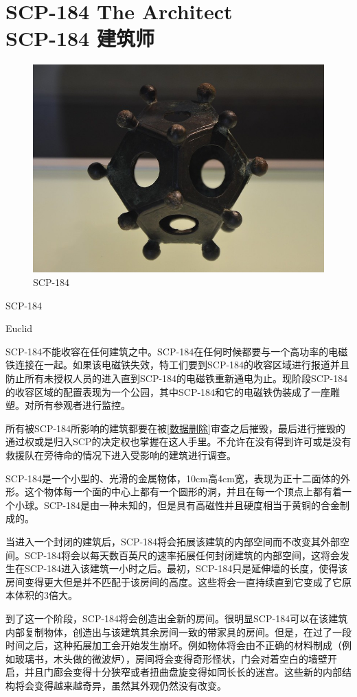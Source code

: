 \chapter[SCP-184 建筑师]{
    SCP-184 The Architect\\
    SCP-184 建筑师
}

\label{chap:SCP-184}

\begin{figure}[H]
    \centering
    \includegraphics[width=0.5\linewidth]{images/SCP-184.jpg}
    \caption*{SCP-184}
\end{figure}

SCP-184

Euclid

SCP-184不能收容在任何建筑之中。SCP-184在任何时候都要与一个高功率的电磁铁连接在一起。如果该电磁铁失效，特工们要到SCP-184的收容区域进行报道并且防止所有未授权人员的进入直到SCP-184的电磁铁重新通电为止。现阶段SCP-184的收容区域的配置表现为一个公园，其中SCP-184和它的电磁铁伪装成了一座雕塑。对所有参观者进行监控。

所有被SCP-184所影响的建筑都要在被{[}\hyperref[chap:TAIL-code-name-the-truth]{数据删除}]审查之后摧毁，最后进行摧毁的通过权或是归入SCP的决定权也掌握在这人手里。不允许在没有得到许可或是没有救援队在旁待命的情况下进入受影响的建筑进行调查。

SCP-184是一个小型的、光滑的金属物体，10cm高4cm宽，表现为正十二面体的外形。这个物体每一个面的中心上都有一个圆形的洞，并且在每一个顶点上都有着一个小球。SCP-184是由一种未知的，但是具有高磁性并且硬度相当于黄铜的合金制成的。

当进入一个封闭的建筑后，SCP-184将会拓展该建筑的内部空间而不改变其外部空间。SCP-184将会以每天数百英尺的速率拓展任何封闭建筑的内部空间，这将会发生在SCP-184进入该建筑一小时之后。最初，SCP-184只是延伸墙的长度，使得该房间变得更大但是并不匹配于该房间的高度。这些将会一直持续直到它变成了它原本体积的3倍大。

到了这一个阶段，SCP-184将会创造出全新的房间。很明显SCP-184可以在该建筑内部复制物体，创造出与该建筑其余房间一致的带家具的房间。但是，在过了一段时间之后，这种拓展加工会开始发生崩坏。例如物体将会由不正确的材料制成（例如玻璃书，木头做的微波炉），房间将会变得奇形怪状，门会对着空白的墙壁开启，并且门廊会变得十分狭窄或者扭曲盘旋变得如同长长的迷宫。这些新的内部结构将会变得越来越奇异，虽然其外观仍然没有改变。

